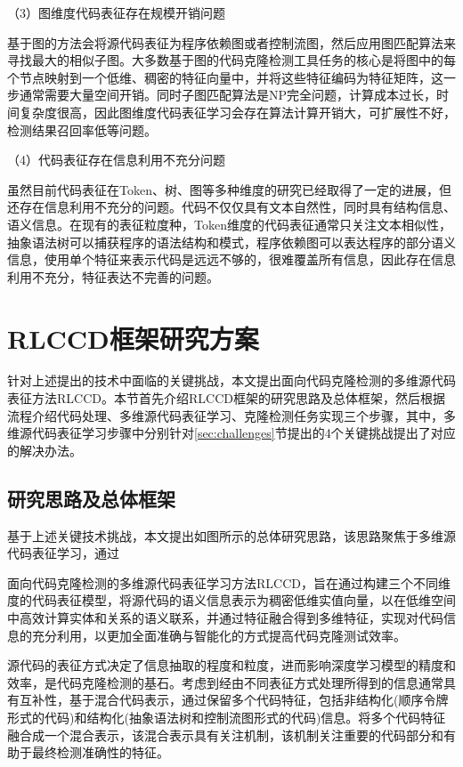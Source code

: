 （3）图维度代码表征存在规模开销问题

基于图的方法会将源代码表征为程序依赖图或者控制流图，然后应用图匹配算法来寻找最大的相似子图。大多数基于图的代码克隆检测工具任务的核心是将图中的每个节点映射到一个低维、稠密的特征向量中，并将这些特征编码为特征矩阵，这一步通常需要大量空间开销。同时子图匹配算法是NP完全问题，计算成本过长，时间复杂度很高，因此图维度代码表征学习会存在算法计算开销大，可扩展性不好，检测结果召回率低等问题。

（4）代码表征存在信息利用不充分问题

虽然目前代码表征在Token、树、图等多种维度的研究已经取得了一定的进展，但还存在信息利用不充分的问题。代码不仅仅具有文本自然性，同时具有结构信息、语义信息。在现有的表征粒度种，Token维度的代码表征通常只关注文本相似性，抽象语法树可以捕获程序的语法结构和模式，程序依赖图可以表达程序的部分语义信息，使用单个特征来表示代码是远远不够的，很难覆盖所有信息，因此存在信息利用不充分，特征表达不完善的问题。

\section{RLCCD框架研究方案}
\label{sec:Framework}
针对上述提出的技术中面临的关键挑战，本文提出面向代码克隆检测的多维源代码表征方法RLCCD。本节首先介绍RLCCD框架的研究思路及总体框架，然后根据流程介绍代码处理、多维源代码表征学习、克隆检测任务实现三个步骤，其中，多维源代码表征学习步骤中分别针对\ref{sec:challenges}节提出的4个关键挑战提出了对应的解决办法。

\subsection{研究思路及总体框架}
\label{subsec:Ideas}
基于上述关键技术挑战，本文提出如图所示的总体研究思路，该思路聚焦于多维源代码表征学习，通过


面向代码克隆检测的多维源代码表征学习方法RLCCD，旨在通过构建三个不同维度的代码表征模型，将源代码的语义信息表示为稠密低维实值向量，以在低维空间中高效计算实体和关系的语义联系，并通过特征融合得到多维特征，实现对代码信息的充分利用，以更加全面准确与智能化的方式提高代码克隆测试效率。 

源代码的表征方式决定了信息抽取的程度和粒度，进而影响深度学习模型的精度和效率，是代码克隆检测的基石。考虑到经由不同表征方式处理所得到的信息通常具有互补性，基于混合代码表示，通过保留多个代码特征，包括非结构化(顺序令牌形式的代码)和结构化(抽象语法树和控制流图形式的代码)信息。将多个代码特征融合成一个混合表示，该混合表示具有关注机制，该机制关注重要的代码部分和有助于最终检测准确性的特征。

